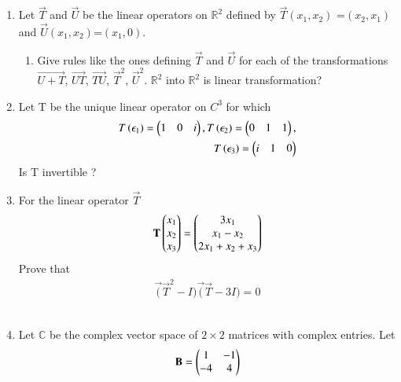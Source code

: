 \renewcommand{\theequation}{\theenumi}
\renewcommand{\thefigure}{\theenumi}
\begin{enumerate}[label=\thesubsection.\arabic*.,ref=\thesubsection.\theenumi]

\item Let $\vec{T}$ and $\vec{U}$ be the linear operators on $\mathbb{R}^2$ defined by
$\vec{T}$$(x_1,x_2)$ =$(x_2,x_1)$ and $\vec{U}$$(x_1,x_2)$=$(x_1,0)$.
\begin{enumerate}
%
\item Give rules like the ones defining $\vec{T}$ and $\vec{U}$ for each of the transformations
$\vec{U + T}$, $\vec{UT}$, $\vec{TU}$, $\vec{T}^2$, $\vec{U}^2$. $\mathbb{R}^2$ into $\mathbb{R}^2$  is linear transformation?
%
\\
\solution

%
\end{enumerate}
\item Let T be the unique linear operator on $C^{3}$ for which 
   \begin{multline}
    \begin{aligned}
    T\left(\epsilon_1\right)=\begin{pmatrix}1&0&i\end{pmatrix} , T\left(\epsilon_2\right)=\begin{pmatrix}0&1&1\end{pmatrix} ,\\ T\left(\epsilon_3\right)=\begin{pmatrix}i&1&0\end{pmatrix} 
    \end{aligned}
    \end{multline}
    Is T invertible ?
%
\\
\solution

\item For the linear operator $\vec{T}$
\begin{align}
    \mathbf{T}\begin{pmatrix}x_1\\x_2\\x_3\end{pmatrix}=\begin{pmatrix}3x_1\\x_1-x_2\\2x_1+x_2+x_3\end{pmatrix}\label{eq:solutions/3/2/4/eq:1}
\end{align}
Prove that
\begin{align}
    \vec(\vec{T}^{2}-I)\vec(\vec{T}-3I)=0
\end{align}
%
\\
\solution

%
\item Let $\mathbb{C}$ be the complex vector space of $2\times2$ matrices with complex entries. Let
\begin{align}
	\mathbf{B} = \begin{pmatrix}1 & -1 \\ -4 & 4\end{pmatrix}
\end{align}

\end{enumerate}
